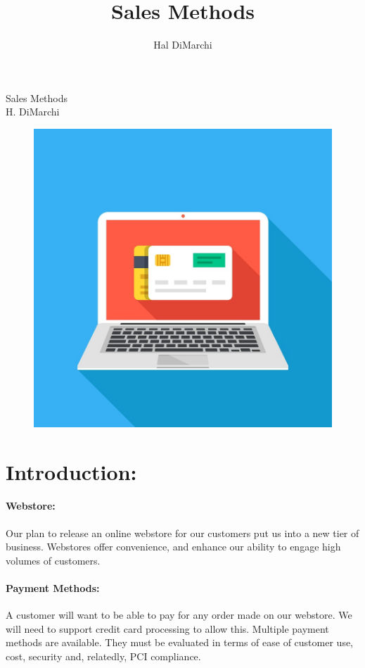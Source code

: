 \documentclass[letterpaper]{article}
\title{Sales Methods}
\author{Hal DiMarchi}
\begin{document}
  \pagecolor{cyan!10}
  \begin{titlepage}
    \centering
    \vfill
    {\Large
        Sales Methods\\
        H. DiMarchi\\
    }
    \vfill
    \begin{figure}[h]
      \centering
      \includegraphics[width=12cm]{best-online-credit-card-processing}
    \end{figure}
  \end{titlepage}
  \tableofcontents
  \newpage
  \section{Introduction:}
    \paragraph{Webstore:}
    Our plan to release an online webstore for our customers put us into a new
    tier of business. Webstores offer convenience, and enhance
    our ability to engage high volumes of customers.
    \paragraph{Payment Methods:}
    A customer will want to be able to pay for any order made on our webstore. We will need to support
    credit card processing to allow this. Multiple payment methods are available. They must be evaluated
    in terms of ease of customer use, cost, security and, relatedly, PCI compliance.
\end{document}

